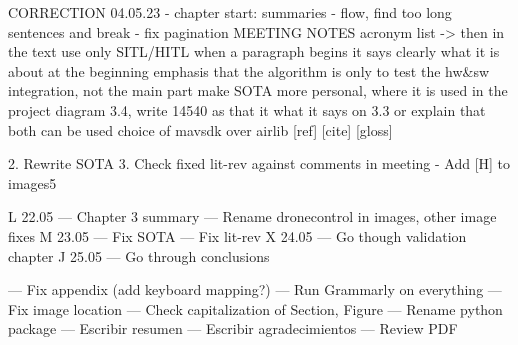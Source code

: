 CORRECTION 04.05.23
 - chapter start: summaries
 - flow, find too long sentences and break
 - fix pagination
 MEETING NOTES
 acronym list -> then in the text use only SITL/HITL
when a paragraph begins it says clearly what it is about at the beginning
emphasis that the algorithm is only to test the hw&sw integration, not the main part
make SOTA more personal, where it is used in the project
diagram 3.4, write 14540 as that it what it says on 3.3 or explain that both can be used
choice of mavsdk over airlib
[ref] [cite] [gloss]


2. Rewrite SOTA
3. Check fixed lit-rev against comments in meeting
- Add [H] to images5


L 22.05 --- Chapter 3 summary
        --- Rename dronecontrol in images, other image fixes
M 23.05 --- Fix SOTA
        --- Fix lit-rev
X 24.05 --- Go though validation chapter
J 25.05 --- Go through conclusions

        --- Fix appendix (add keyboard mapping?)
        --- Run Grammarly on everything
        --- Fix image location
        --- Check capitalization of Section, Figure
        --- Rename python package
        --- Escribir resumen
        --- Escribir agradecimientos
        --- Review PDF